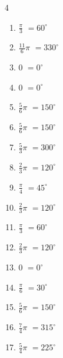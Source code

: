 \begin{multicols}{4}
\begin{enumerate}
  \item $\displaystyle \frac{\pi}{3}$
        $\displaystyle =60^{\circ}$

  \item $\displaystyle \frac{11}{6}\pi$
        $\displaystyle =330^{\circ}$

\columnbreak %

\resetques

  \item $\displaystyle 0$
        $\displaystyle =0^{\circ}$

  \item $\displaystyle 0$
        $\displaystyle =0^{\circ}$

  \item $\displaystyle \frac{5}{6}\pi$
        $\displaystyle =150^{\circ}$

  \item $\displaystyle \frac{5}{6}\pi$
        $\displaystyle =150^{\circ}$

  \item $\displaystyle \frac{5}{3}\pi$
        $\displaystyle =300^{\circ}$

  \item $\displaystyle \frac{2}{3}\pi$
        $\displaystyle =120^{\circ}$

  \item $\displaystyle \frac{\pi}{4}$
        $\displaystyle =45^{\circ}$

  \item $\displaystyle \frac{2}{3}\pi$
        $\displaystyle =120^{\circ}$

  \item $\displaystyle \frac{\pi}{3}$
        $\displaystyle =60^{\circ}$

  \item $\displaystyle \frac{2}{3}\pi$
        $\displaystyle =120^{\circ}$

  \item $\displaystyle 0$
        $\displaystyle =0^{\circ}$

  \item $\displaystyle \frac{\pi}{6}$
        $\displaystyle =30^{\circ}$

  \item $\displaystyle \frac{5}{6}\pi$
        $\displaystyle =150^{\circ}$

  \item $\displaystyle \frac{7}{4}\pi$
        $\displaystyle =315^{\circ}$

  \item $\displaystyle \frac{5}{4}\pi$
        $\displaystyle =225^{\circ}$


\end{enumerate}
\end{multicols}
